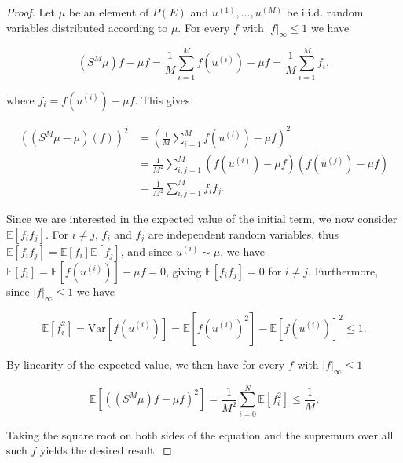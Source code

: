 \begin{proof}
  Let $\mu$ be an element of $P(E)$ and $u^{(1)}, \ldots, u^{(M)}$ be i.i.d. random variables distributed according to $\mu$. For every $f$ with $|f|_\infty \le 1$ we have 
  
  \begin{equation*}
    (S^M\mu)f - \mu f = \frac1{M}\sum_{i=1}^Mf(u^{(i)}) - \mu f = \frac1{M}\sum_{i=1}^Mf_i,
  \end{equation*}

  where $f_i = f(u^{(i)}) - \mu f$. This gives

  \begin{equation*}
    \begin{aligned}
      ((S^M\mu - \mu)(f))^2
      &= \left(\frac1{M}\sum_{i=1}^Mf(u^{(i)}) - \mu f\right)^2\\
      &= \frac1{M^2}\sum_{i,j=1}^M(f(u^{(i)}) - \mu f)(f(u^{(j)}) - \mu f)\\
      &= \frac1{M^2}\sum_{i,j=1}^Mf_if_j.
    \end{aligned}
  \end{equation*}

  Since we are interested in the expected value of the initial term, we now consider $\mathbb{E}[f_if_j]$. For $i \neq j$, $f_i$ and $f_j$ are independent random variables, thus $\mathbb{E}[f_if_j] = \mathbb{E}[f_i]\mathbb{E}[f_j]$, and since $u^{(i)} \sim \mu$, we have $\mathbb{E}[f_i] = \mathbb{E}[f(u^{(i)})] - \mu f = 0$, giving $\mathbb{E}[f_if_j] = 0$ for $i \neq j$. Furthermore, since $|f|_\infty \le 1$ we have

  \begin{equation*}
    \mathbb{E}[f_i^2] = \text{Var}[f(u^{(i)})] = \mathbb{E}[f(u^{(i)})^2] - \mathbb{E}[f(u^{(i)})]^2 \leq 1.
  \end{equation*}

  By linearity of the expected value, we then have for every $f$ with $|f|_\infty \le 1$

  \begin{equation*}
    \mathbb{E}[( (S^M\mu)f - \mu f)^2] = \frac1{M^2}\sum_{i=0}^N\mathbb{E}[f_i^2] \le \frac1{M}.
  \end{equation*}

  Taking the square root on both sides of the equation and the supremum over all such $f$ yields the desired result.
\end{proof}

